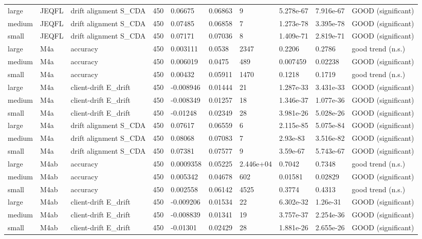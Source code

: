 \begin{table}[t]
\begin{tabular}{llllllllll}
large & JEQFL & drift alignment S\_CDA & 450 & 0.06675 & 0.06863 & 9 & 5.278e-67 & 7.916e-67 & GOOD (significant) \\
medium & JEQFL & drift alignment S\_CDA & 450 & 0.07485 & 0.06858 & 7 & 1.273e-78 & 3.395e-78 & GOOD (significant) \\
small & JEQFL & drift alignment S\_CDA & 450 & 0.07171 & 0.07036 & 8 & 1.409e-71 & 2.819e-71 & GOOD (significant) \\
large & M4a & accuracy & 450 & 0.003111 & 0.0538 & 2347 & 0.2206 & 0.2786 & good trend (n.s.) \\
medium & M4a & accuracy & 450 & 0.006019 & 0.0475 & 489 & 0.007459 & 0.02238 & GOOD (significant) \\
small & M4a & accuracy & 450 & 0.00432 & 0.05911 & 1470 & 0.1218 & 0.1719 & good trend (n.s.) \\
large & M4a & client-drift E\_drift & 450 & -0.008946 & 0.01444 & 21 & 1.287e-33 & 3.431e-33 & GOOD (significant) \\
medium & M4a & client-drift E\_drift & 450 & -0.008349 & 0.01257 & 18 & 1.346e-37 & 1.077e-36 & GOOD (significant) \\
small & M4a & client-drift E\_drift & 450 & -0.01248 & 0.02349 & 28 & 3.981e-26 & 5.028e-26 & GOOD (significant) \\
large & M4a & drift alignment S\_CDA & 450 & 0.07617 & 0.06559 & 6 & 2.115e-85 & 5.075e-84 & GOOD (significant) \\
medium & M4a & drift alignment S\_CDA & 450 & 0.08068 & 0.07083 & 7 & 2.93e-83 & 3.516e-82 & GOOD (significant) \\
small & M4a & drift alignment S\_CDA & 450 & 0.07381 & 0.07577 & 9 & 3.59e-67 & 5.743e-67 & GOOD (significant) \\
large & M4ab & accuracy & 450 & 0.0009358 & 0.05225 & 2.446e+04 & 0.7042 & 0.7348 & good trend (n.s.) \\
medium & M4ab & accuracy & 450 & 0.005342 & 0.04678 & 602 & 0.01581 & 0.02829 & GOOD (significant) \\
small & M4ab & accuracy & 450 & 0.002558 & 0.06142 & 4525 & 0.3774 & 0.4313 & good trend (n.s.) \\
large & M4ab & client-drift E\_drift & 450 & -0.009206 & 0.01534 & 22 & 6.302e-32 & 1.26e-31 & GOOD (significant) \\
medium & M4ab & client-drift E\_drift & 450 & -0.008839 & 0.01341 & 19 & 3.757e-37 & 2.254e-36 & GOOD (significant) \\
small & M4ab & client-drift E\_drift & 450 & -0.01301 & 0.02429 & 28 & 1.881e-26 & 2.655e-26 & GOOD (significant) \\

\end{tabular}
\end{table}
